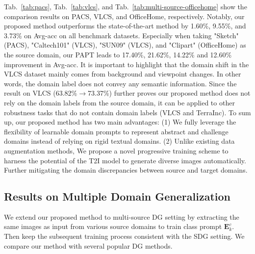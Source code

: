 Tab.~\ref{tab:pacs}, Tab.~\ref{tab:vlcs}, and Tab.~\ref{tab:multi-source-officehome} show the comparison results on PACS, VLCS, and OfficeHome, respectively. 
Notably, our proposed method outperforms the state-of-the-art method by 1.60\%, 9.55\%, and 3.73\% on Avg-acc on all benchmark datasets. 
Especially when taking "Sketch" (PACS), "Caltech101" (VLCS), "SUN09" (VLCS), and "Clipart" (OfficeHome) as the source domain, our PAPT leads to 17.40\%, 21.62\%, 14.22\% and 12.60\% improvement in Avg-acc.
It is important to highlight that the domain shift in the VLCS dataset mainly comes from background and viewpoint changes.
In other words, the domain label does not convey any semantic information.
Since the result on VLCS (63.82\%$\rightarrow$73.37\%) further proves our proposed method does not rely on the domain labels from the source domain, it can be applied to other robustness tasks that do not contain domain labels (VLCS and TerraInc). 
To sum up, our proposed method has two main advantages: 
(1) We fully leverage the flexibility of learnable domain prompts to represent abstract and challenge domains instead of relying on rigid textual domains.
(2) Unlike existing data augmentation methods, We propose a novel progressive training scheme to harness the potential of the T2I model to generate diverse images automatically.
Further mitigating the domain discrepancies between source and target domains. 


\subsection{Results on Multiple Domain Generalization}
We extend our proposed method to multi-source DG setting by extracting the same images as input from various source domains to train class prompt $\mathbf{E}_k^c$. Then keep the subsequent training process consistent with the SDG setting.
We compare our method with several popular DG methods.


